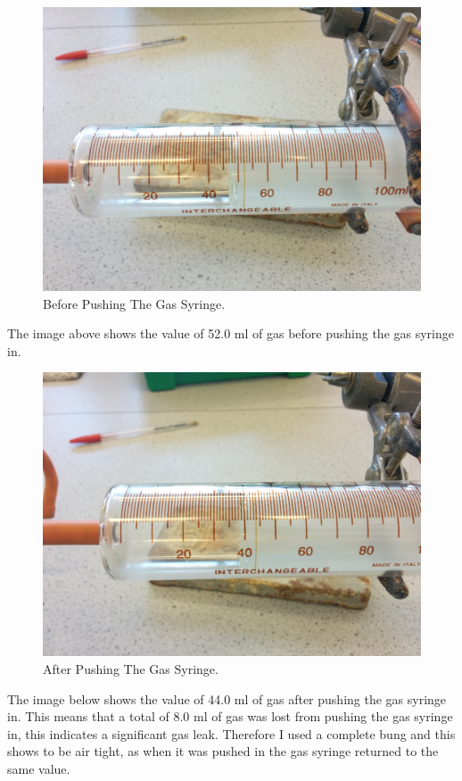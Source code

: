 \begin{figure}[H]
    \includegraphics[width=\textwidth]{./preliminarywork/images/BeforePush.jpg}
    \caption{Before Pushing The Gas Syringe.} \label{fig:BeforePush}
\end{figure}

The image above shows the value of 52.0 ml of gas before pushing the gas syringe in.

\begin{figure}[H]
    \includegraphics[width=\textwidth]{./preliminarywork/images/AfterPush.jpg}
    \caption{After Pushing The Gas Syringe.} \label{fig:AfterPush}
\end{figure}

The image below shows the value of 44.0 ml of gas after pushing the gas syringe in. This means that a total of 8.0 ml of gas was lost from pushing the gas syringe in, this indicates a significant gas leak. Therefore I used a complete bung and this shows to be air tight, as when it was pushed in the gas syringe returned to the same value.



